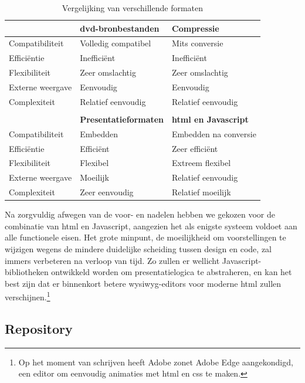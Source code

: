 \begin{table}[h!]
  \begin{center}
    \begin{tabular}{p{3cm} | p{4cm} p{4cm}}
    & \textbf{\acs{dvd}-bronbestanden} & \textbf{Compressie} \\
    \hline
    \hline
    Compatibiliteit & Volledig compatibel & Mits conversie \\
    Efficiëntie & Inefficiënt & Inefficiënt \\
    Flexibiliteit & Zeer omslachtig & Zeer omslachtig \\
    Externe weergave & Eenvoudig & Eenvoudig \\
    Complexiteit & Relatief eenvoudig & Relatief eenvoudig \\
    \\    
    & \textbf{Presentatieformaten} & \textbf{\ac{html} en Javascript} \\
    \hline
    \hline
    Compatibiliteit & Embedden & Embedden na conversie \\
    Efficiëntie & Efficiënt & Zeer efficiënt \\
    Flexibiliteit & Flexibel & Extreem flexibel \\
    Externe weergave & Moeilijk & Relatief eenvoudig \\
    Complexiteit & Zeer eenvoudig & Relatief moeilijk \\
    \end{tabular}
  \end{center}
  \caption{Vergelijking van verschillende formaten}
\end{table}

Na zorgvuldig afwegen van de voor- en nadelen hebben we gekozen voor de combinatie van \ac{html} en Javascript, aangezien het als enigste systeem voldoet aan alle functionele eisen. Het grote minpunt, de moeilijkheid om voorstellingen te wijzigen wegens de mindere duidelijke scheiding tussen design en code, zal immers verbeteren na verloop van tijd. Zo zullen er wellicht Javascript-bibliotheken ontwikkeld worden om presentatielogica te abstraheren, en kan het best zijn dat er binnenkort betere \ac{wysiwyg}-editors voor moderne \ac{html} zullen verschijnen.\footnote{Op het moment van schrijven heeft Adobe zonet Adobe Edge aangekondigd, een editor om eenvoudig animaties met \ac{html} en \ac{css} te maken.}

\subsection{Repository}

